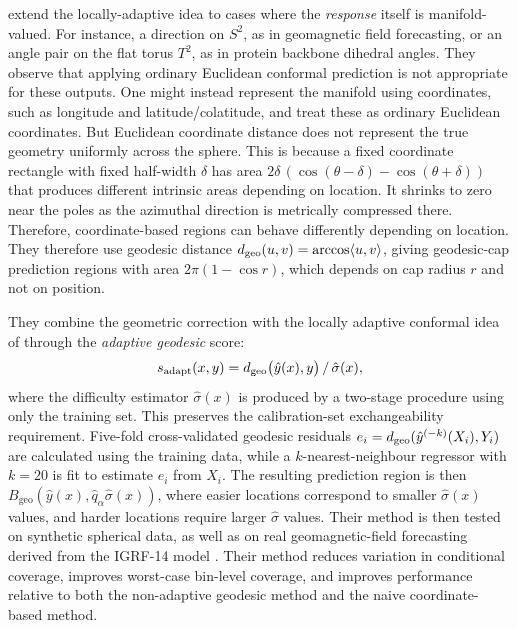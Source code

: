 \citet{amirishahbazi2026} extend the locally-adaptive idea to cases where the \emph{response} itself is manifold-valued. For instance, a direction on $S^2$, as in geomagnetic field forecasting, or an angle pair on the flat torus $T^2$, as in protein backbone dihedral angles. They observe that applying ordinary Euclidean conformal prediction is not appropriate for these outputs. One might instead represent the manifold using coordinates, such as longitude and latitude/colatitude, and treat these as ordinary Euclidean coordinates. But Euclidean coordinate distance does not represent the true geometry uniformly across the sphere. This is because a fixed coordinate rectangle with fixed half-width $\delta$ has area $2\delta\,(\cos(\theta-\delta) - \cos(\theta+\delta))$ that produces different intrinsic areas depending on location. It shrinks to zero near the poles as the azimuthal direction is metrically compressed there. Therefore, coordinate-based regions can behave differently depending on location. They therefore use geodesic distance $d_{\mathrm{geo}}(u,v) = \arccos\langle u,v\rangle$, giving geodesic-cap prediction regions with area $2\pi(1-\cos r)$, which depends on cap radius $r$ and not on position.

They combine the geometric correction with the locally adaptive conformal idea of \citet{lei2018,romano2019} through the \emph{adaptive geodesic} score:
\begin{equation}
    s_{\mathrm{adapt}}(x,y) = d_{\mathrm{geo}}\big(\hat y(x), y\big) \,/\, \hat\sigma(x),
    \label{eq:paper-score}
\end{equation}
where the difficulty estimator $\hat\sigma(x)$ is produced by a two-stage procedure using only the training set. This preserves the calibration-set exchangeability requirement. Five-fold cross-validated geodesic residuals $e_i = d_{\mathrm{geo}}(\hat y^{(-k)}(X_i), Y_i)$ are calculated using the training data, while a $k$-nearest-neighbour regressor with $k=20$ is fit to estimate $e_i$ from $X_i$.  The resulting prediction region is then $B_{\mathrm{geo}}(\hat y(x), \hat q_\alpha \hat\sigma(x))$, where easier locations correspond to smaller $\hat{\sigma}(x)$ values, and harder locations require larger $\hat{\sigma}$ values. Their method is then tested on synthetic spherical data, as well as on real geomagnetic-field forecasting derived from the IGRF-14 model \citep{alken2021}. Their method reduces variation in conditional coverage, improves worst-case bin-level coverage, and improves performance relative to both the non-adaptive geodesic method and the naive coordinate-based method.
 
